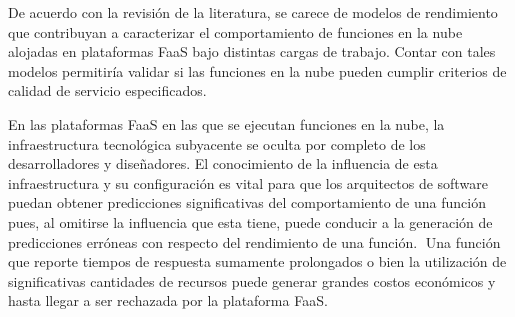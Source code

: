 De acuerdo con la revisión de la literatura, se carece de modelos de rendimiento que contribuyan a caracterizar el comportamiento de funciones en la nube alojadas en plataformas FaaS bajo distintas cargas de trabajo. Contar con tales modelos permitiría validar si las funciones en la nube pueden cumplir criterios de calidad de servicio especificados.


En las plataformas FaaS en las que se ejecutan funciones en la nube, la infraestructura tecnológica subyacente se oculta por completo de los desarrolladores y diseñadores. El conocimiento de la influencia de esta infraestructura y su configuración es vital para que los arquitectos de software puedan obtener predicciones significativas del comportamiento de una función pues, al omitirse la influencia que esta tiene, puede conducir a la generación de predicciones erróneas con respecto del rendimiento de una función. Una función que reporte tiempos de respuesta sumamente prolongados o bien la utilización de significativas cantidades de recursos puede generar grandes costos económicos y hasta llegar a ser rechazada por la plataforma FaaS.

